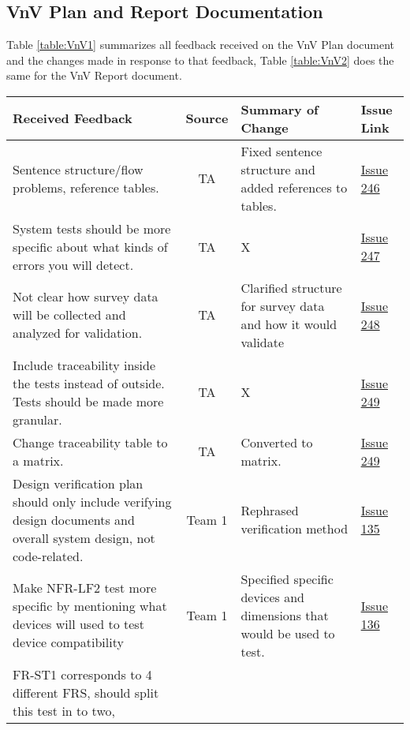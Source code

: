 \documentclass{article}
\begin{document}
\subsection{VnV Plan and Report Documentation}
Table \ref{table:VnV1} summarizes all feedback received on the VnV Plan document
and the changes made in response to that feedback, Table \ref{table:VnV2} does
the same for the VnV Report document.
\begin{table}[H]
\centering
\begin{tabularx}{\textwidth}{|X|c|X|p{1.5cm}|}
    \hline
    \textbf{Received Feedback} & \textbf{Source} & \textbf{Summary of Change}
    & \textbf{Issue Link} \\
    \hline
    Sentence structure/flow problems, reference tables. & TA & Fixed sentence
    structure and added references to tables. &
    \href{https://github.com/SumanyaG/Alkalytics/issues/246}{Issue 246} \\
    \hline
    System tests should be more specific about what kinds of errors you will
    detect. & TA & X &
    \href{https://github.com/SumanyaG/Alkalytics/issues/247}{Issue 247} \\
    \hline
    Not clear how survey data will be collected and analyzed for validation. &
    TA & Clarified structure for survey data and how it would validate &
    \href{https://github.com/SumanyaG/Alkalytics/issues/248}{Issue 248} \\
    \hline
    Include traceability inside the tests instead of outside. Tests should be
    made more granular. & TA & X &
    \href{https://github.com/SumanyaG/Alkalytics/issues/249}{Issue 249} \\
    \hline
    Change traceability table to a matrix. & TA & Converted to matrix. &
    \href{https://github.com/SumanyaG/Alkalytics/issues/249}{Issue 249} \\
    \hline
    Design verification plan should only include verifying design documents and
    overall system design, not code-related. & Team 1 & Rephrased verification
    method & \href{https://github.com/SumanyaG/Alkalytics/issues/135}{Issue 135}
    \\
    \hline
    Make NFR-LF2 test more specific by mentioning what devices will used to test
    device compatibility & Team 1 & Specified specific devices and dimensions
    that would be used to test. &
    \href{https://github.com/SumanyaG/Alkalytics/issues/136}{Issue 136} \\
    \hline
    FR-ST1 corresponds to 4 different FRS, should split this test in to two,

\end{tabularx}
\end{table}
\end{document}
